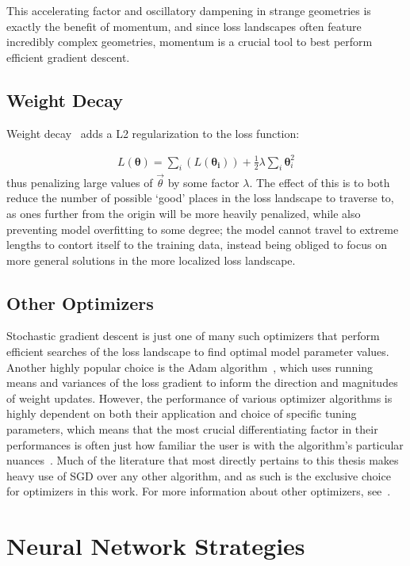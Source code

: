 This accelerating factor and oscillatory
dampening in strange geometries is exactly the benefit of momentum, and since loss landscapes often feature incredibly
complex geometries, momentum is a crucial tool to best perform efficient gradient descent.

 \subsection{Weight Decay}
Weight decay~\citep{krogh1992} adds a L2 regularization to the loss function:

\begin{align}
	\mathit{L}(\mathbf{\theta}) = \sum_i (\mathit{L}(\mathbf{\theta_i})) + \frac{1}{2} \lambda \sum_{i} \mathbf{\theta}_{i}^{2}
 \end{align}
thus penalizing large values of $\vec{\theta}$ by some factor $\lambda$. The effect of this is to both reduce the
number of possible `good' places in the loss landscape to traverse to, as ones further from the origin will be
more heavily penalized, while also preventing model overfitting to some degree; the model cannot travel to extreme
lengths to contort itself to the training data, instead being obliged to focus on more general solutions in the more localized
loss landscape.

\subsection{Other Optimizers}
Stochastic gradient descent is just one of many such optimizers that perform efficient searches of the loss landscape
to find optimal model parameter values. Another highly popular choice is the Adam algorithm~\citep{kingma2015}, which uses
running means and variances of the loss gradient to inform the direction and magnitudes of weight updates. However,
the performance of various optimizer algorithms is highly dependent on both their application and choice of specific
tuning parameters, which means that the most crucial differentiating factor in their performances is often just
how familiar the user is with the algorithm's particular nuances~\citep{goodfellow2016}. Much of the literature that most
directly pertains to this thesis makes heavy use of SGD over any other algorithm, and as such is the exclusive choice
for optimizers in this work. For more information about other optimizers, see~\cite{goodfellow2016}.

\section{Neural Network Strategies} \label{sect:nn_train_end}
